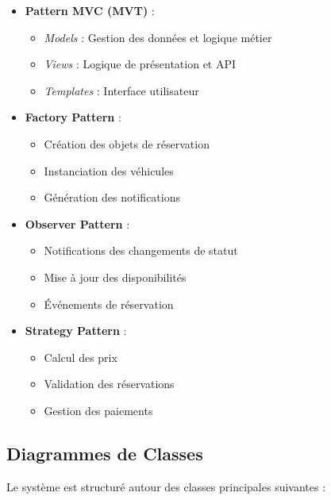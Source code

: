 \begin{itemize}
    \item \textbf{Pattern MVC (MVT)} :
    \begin{itemize}
        \item \textit{Models} : Gestion des données et logique métier
        \item \textit{Views} : Logique de présentation et API
        \item \textit{Templates} : Interface utilisateur
    \end{itemize}
    
    \item \textbf{Factory Pattern} :
    \begin{itemize}
        \item Création des objets de réservation
        \item Instanciation des véhicules
        \item Génération des notifications
    \end{itemize}
    
    \item \textbf{Observer Pattern} :
    \begin{itemize}
        \item Notifications des changements de statut
        \item Mise à jour des disponibilités
        \item Événements de réservation
    \end{itemize}
    
    \item \textbf{Strategy Pattern} :
    \begin{itemize}
        \item Calcul des prix
        \item Validation des réservations
        \item Gestion des paiements
    \end{itemize}
\end{itemize}

\subsection{Diagrammes de Classes}
Le système est structuré autour des classes principales suivantes :

